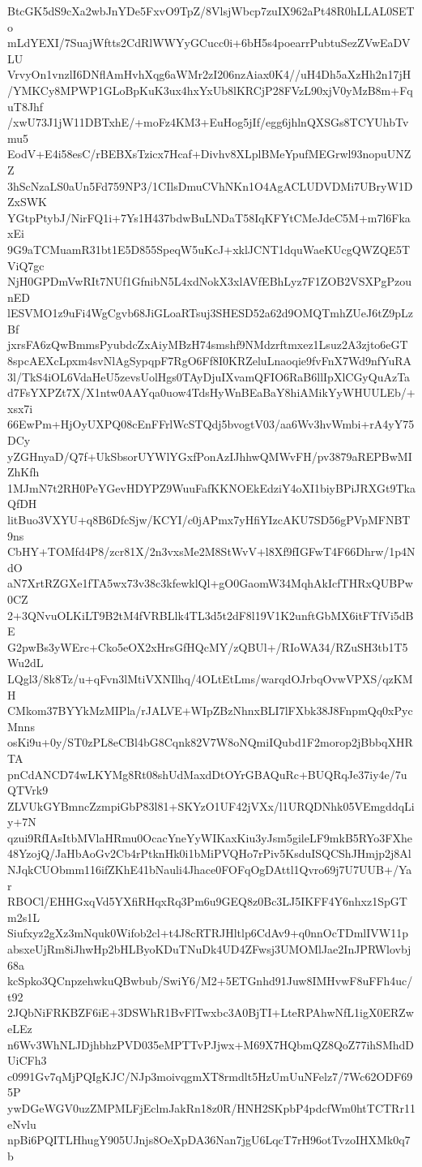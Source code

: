 BtcGK5dS9cXa2wbJnYDe5FxvO9TpZ/8VlsjWbcp7zuIX962aPt48R0hLLAL0SETo
mLdYEXI/7SuajWftts2CdRlWWYyGCucc0i+6bH5s4poearrPubtuSezZVwEaDVLU
VrvyOn1vnzlI6DNflAmHvhXqg6aWMr2zI206nzAiax0K4//uH4Dh5aXzHh2n17jH
/YMKCy8MPWP1GLoBpKuK3ux4hxYxUb8lKRCjP28FVzL90xjV0yMzB8m+FquT8Jhf
/xwU73J1jW11DBTxhE/+moFz4KM3+EuHog5jIf/egg6jhlnQXSGs8TCYUhbTvmu5
EodV+E4i58esC/rBEBXsTzicx7Hcaf+Divhv8XLplBMeYpufMEGrwl93nopuUNZZ
3hScNzaLS0aUn5Fd759NP3/1CIlsDmuCVhNKn1O4AgACLUDVDMi7UBryW1DZxSWK
YGtpPtybJ/NirFQ1i+7Ys1H437bdwBuLNDaT58IqKFYtCMeJdeC5M+m7l6FkaxEi
9G9aTCMuamR31bt1E5D855SpeqW5uKcJ+xklJCNT1dquWaeKUcgQWZQE5TViQ7gc
NjH0GPDmVwRIt7NUf1GfnibN5L4xdNokX3xlAVfEBhLyz7F1ZOB2VSXPgPzounED
lESVMO1z9uFi4WgCgvb68JiGLoaRTsuj3SHESD52a62d9OMQTmhZUeJ6tZ9pLzBf
jxrsFA6zQwBmmsPyubdcZxAiyMBzH74smshf9NMdzrftmxez1Lsuz2A3zjto6eGT
8spcAEXcLpxm4svNlAgSypqpF7RgO6Ff8I0KRZeluLnaoqie9fvFnX7Wd9nfYuRA
3l/TkS4iOL6VdaHeU5zevsUolHgs0TAyDjuIXvamQFIO6RaB6llIpXlCGyQuAzTa
d7FsYXPZt7X/X1ntw0AAYqa0uow4TdsHyWnBEaBaY8hiAMikYyWHUULEb/+xsx7i
66EwPm+HjOyUXPQ08cEnFFrlWcSTQdj5bvogtV03/aa6Wv3hvWmbi+rA4yY75DCy
yZGHnyaD/Q7f+UkSbsorUYWlYGxfPonAzIJhhwQMWvFH/pv3879aREPBwMIZhKfh
1MJmN7t2RH0PeYGevHDYPZ9WuuFafKKNOEkEdziY4oXI1biyBPiJRXGt9TkaQfDH
litBuo3VXYU+q8B6DfcSjw/KCYI/c0jAPmx7yHfiYIzcAKU7SD56gPVpMFNBT9ns
CbHY+TOMfd4P8/zcr81X/2n3vxsMe2M8StWvV+l8Xf9fIGFwT4F66Dhrw/1p4NdO
aN7XrtRZGXe1fTA5wx73v38c3kfewklQl+gO0GaomW34MqhAkIcfTHRxQUBPw0CZ
2+3QNvuOLKiLT9B2tM4fVRBLlk4TL3d5t2dF8l19V1K2unftGbMX6itFTfVi5dBE
G2pwBs3yWErc+Cko5eOX2xHrsGfHQcMY/zQBUl+/RIoWA34/RZuSH3tb1T5Wu2dL
LQgl3/8k8Tz/u+qFvn3lMtiVXNIlhq/4OLtEtLms/warqdOJrbqOvwVPXS/qzKMH
CMkom37BYYkMzMIPla/rJALVE+WIpZBzNhnxBLI7lFXbk38J8FnpmQq0xPycMnns
osKi9u+0y/ST0zPL8eCBl4bG8Cqnk82V7W8oNQmiIQubd1F2morop2jBbbqXHRTA
pnCdANCD74wLKYMg8Rt08shUdMaxdDtOYrGBAQuRc+BUQRqJe37iy4e/7uQTVrk9
ZLVUkGYBmncZzmpiGbP83l81+SKYzO1UF42jVXx/l1URQDNhk05VEmgddqLiy+7N
qzui9RfIAsItbMVlaHRmu0OcacYneYyWIKaxKiu3yJsm5gileLF9mkB5RYo3FXhe
48YzojQ/JaHbAoGv2Cb4rPtknHk0i1bMiPVQHo7rPiv5KsduISQCShJHmjp2j8Al
NJqkCUObmm116ifZKhE41bNauli4Jhace0FOFqOgDAttl1Qvro69j7U7UUB+/Yar
RBOCl/EHHGxqVd5YXfiRHqxRq3Pm6u9GEQ8z0Bc3LJ5IKFF4Y6nhxz1SpGTm2s1L
Siufxyz2gXz3mNquk0Wifob2cl+t4J8cRTRJHltlp6CdAv9+q0nnOcTDmlIVW11p
absxeUjRm8iJhwHp2bHLByoKDuTNuDk4UD4ZFwsj3UMOMlJae2InJPRWlovbj68a
kcSpko3QCnpzehwkuQBwbub/SwiY6/M2+5ETGnhd91Juw8IMHvwF8uFFh4uc/t92
2JQbNiFRKBZF6iE+3DSWhR1BvFlTwxbc3A0BjTI+LteRPAhwNfL1igX0ERZweLEz
n6Wv3WhNLJDjhbhzPVD035eMPTTvPJjwx+M69X7HQbmQZ8QoZ77ihSMhdDUiCFh3
c0991Gv7qMjPQIgKJC/NJp3moivqgmXT8rmdlt5HzUmUuNFelz7/7Wc62ODF695P
ywDGeWGV0uzZMPMLFjEclmJakRn18z0R/HNH2SKpbP4pdcfWm0htTCTRr11eNvlu
npBi6PQITLHhugY905UJnjs8OeXpDA36Nan7jgU6LqcT7rH96otTvzoIHXMk0q7b
